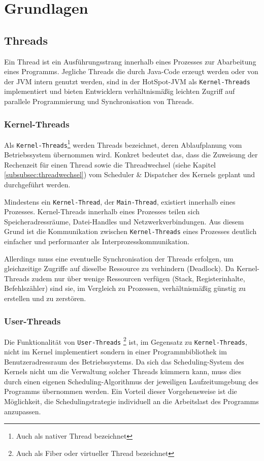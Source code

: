 \section{Grundlagen}
\label{sec:grundlagen}

\subsection{Threads}
\label{subsec:threads}
Ein Thread ist ein Ausführungsstrang innerhalb eines Prozesses zur Abarbeitung eines Programms.
Jegliche Threads die durch Java-Code erzeugt werden oder von der JVM intern genutzt werden,
sind in der HotSpot-JVM als \verb|Kernel-Threads| implementiert
und bieten Entwicklern verhältnismäßig leichten Zugriff auf parallele Programmierung und Synchronisation von Threads.
\parencite[Absatz Thread Management]{OpenJDKHotspotOverview}

\subsubsection{Kernel-Threads}
\label{subsubsec:kernel-threads}
Als \verb|Kernel-Threads|\footnote{Auch als nativer Thread bezeichnet} werden Threads bezeichnet, deren Ablaufplanung vom Betriebssystem übernommen wird.
Konkret bedeutet das, dass die Zuweisung der Rechenzeit für einen Thread sowie die Threadwechsel (siehe Kapitel \ref{subsubsec:threadwechsel})
vom Scheduler \& Dispatcher des Kernels geplant und durchgeführt werden.

Mindestens ein \verb|Kernel-Thread|, der \verb|Main-Thread|, existiert innerhalb eines Prozesses. Kernel-Threads innerhalb eines Prozesses
teilen sich Speicheradressräume, Datei-Handles und Netzwerkverbindungen.
Aus diesem Grund ist die Kommunikation zwischen \verb|Kernel-Threads| eines Prozesses deutlich einfacher und performanter
als Interprozesskommunikation.

Allerdings muss eine eventuelle Synchronisation der Threads erfolgen, um gleichzeitige Zugriffe auf dieselbe Ressource zu verhindern
(Deadlock).
Da Kernel-Threads zudem nur über wenige Ressourcen verfügen (Stack, Registerinhalte, Befehlszähler) sind sie, im Vergleich zu Prozessen,
verhältnismäßig günstig zu erstellen und zu zerstören.\parencite[Kapitel 2.2.5]{Tanenbaum2016}

\subsubsection{User-Threads}
\label{subsubsec:user-threads}
Die Funktionalität von \verb|User-Threads| \footnote{Auch als Fiber oder virtueller Thread bezeichnet} ist,
im Gegensatz zu \verb|Kernel-Threads|,
nicht im Kernel implementiert sondern in einer Programmbibliothek im Benutzeradressraum des Betriebssystems.
Da sich das Scheduling-System des Kernels nicht um die Verwaltung solcher Threads kümmern kann, muss dies durch einen eigenen Scheduling-Algorithmus
der jeweiligen Laufzeitumgebung des Programms übernommen werden.
Ein Vorteil dieser Vorgehensweise ist die Möglichkeit, die Schedulingstrategie individuell an die Arbeitslast des Programms anzupassen.

